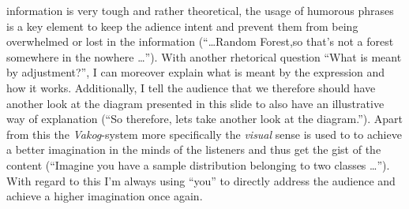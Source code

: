 information is very tough and rather theoretical, the usage of humorous phrases is a key element to keep the adience intent and prevent them from being overwhelmed or lost in the information (\enquote{\dots Random Forest,so that's not a forest somewhere in the nowhere \dots}). With another rhetorical question \enquote{What is meant by adjustment?}, I can moreover explain what is meant by the expression and how it works. Additionally, I tell the audience that we therefore should have another look at the diagram presented in this slide to also have an illustrative way of explanation (\enquote{So therefore, lets take another look at the diagram.}). Apart from this the \textit{Vakog}-system more specifically the \textit{visual} sense is used to to achieve a better imagination in the minds of the listeners and thus get the gist of the content (\enquote{Imagine you have a sample distribution belonging to two classes \dots}). With regard to this I'm always using \enquote{you} to directly address the audience and achieve a higher imagination once again.